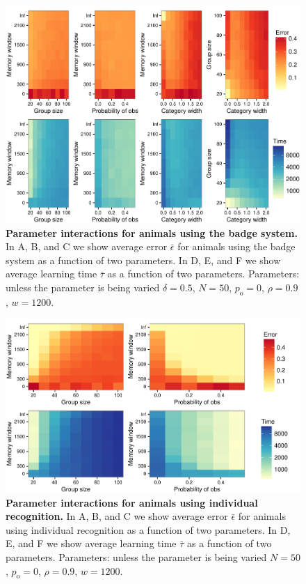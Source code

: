 \begin{figure}[ht]
\includegraphics[width=.8\textwidth]{figures/parameter_interactions_badge.pdf}
\caption{\sffamily\small\textbf{Parameter interactions for animals using the badge system.}
In A, B, and C we show average error $\bar{\epsilon}$ for animals using the badge system as a function of two parameters. In D, E, and F we show average learning time $\bar{\tau}$ as a function of two parameters. Parameters: unless the parameter is being varied $\delta = 0.5$, $N=50$, $p_\text{o}=0$, $\rho=0.9$, $w=1200$.}
\label{interactions_badge}
\end{figure}

\begin{figure}[ht]
\includegraphics[width=.8\textwidth]{figures/parameter_interactions_indiv.pdf}
\caption{\sffamily\small\textbf{Parameter interactions for animals using individual recognition.}
In A, B, and C we show average error $\bar{\epsilon}$ for animals using individual recognition as a function of two parameters. In D, E, and F we show average learning time $\bar{\tau}$ as a function of two parameters. Parameters: unless the parameter is being varied $N=50$, $p_\text{o}=0$, $\rho=0.9$, $w=1200$.}
\label{interactions_indiv}
\end{figure}

